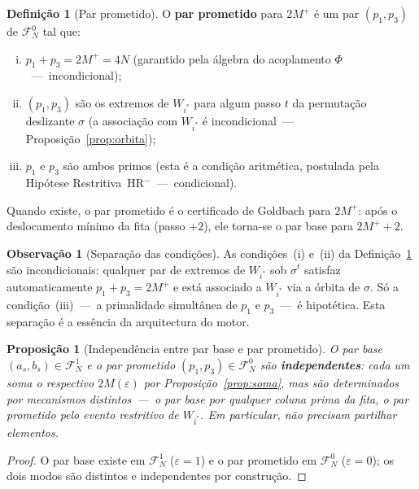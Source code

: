 \documentclass[12pt, a4paper]{article}
\theoremstyle{plain}
\newtheorem{proposition}[theorem]{Proposição}
\theoremstyle{definition}
\newtheorem{definition}[theorem]{Definição}
\newtheorem{remark}[theorem]{Observação}
\theoremstyle{remark}
\begin{document}
	\begin{definition}[Par prometido]
		\label{def:prometido}
		O \textbf{par prometido} para $2M^+$ é um par $(p_1,p_3)$ de
		$\mathcal{F}_N^0$ tal que:
		\begin{enumerate}[(i)]
			\item $p_1+p_3=2M^+=4N$
			(garantido pela álgebra do acoplamento $\Phi$~---~incondicional);
			\item $(p_1,p_3)$ são os extremos de $W_{i^*}$ para algum
			passo $t$ da permutação deslizante $\sigma$
			(a associação com $W_{i^*}$ é incondicional~---~
			Proposição~\ref{prop:orbita});
			\item $p_1$ e $p_3$ são ambos primos
			(esta é a condição aritmética, postulada pela Hipótese
			Restritiva~HR$^-$~---~condicional).
		\end{enumerate}
		Quando existe, o par prometido é o certificado de Goldbach para
		$2M^+$: após o deslocamento mínimo da fita (passo $+2$), ele
		torna-se o par base para $2M^++2$.
	\end{definition}
	
	\begin{remark}[Separação das condições]
		As condições~(i) e~(ii) da Definição~\ref{def:prometido} são
		incondicionais: qualquer par de extremos de $W_{i^*}$ sob
		$\sigma^t$ satisfaz automaticamente $p_1+p_3=2M^+$ e está
		associado a $W_{i^*}$ via a órbita de $\sigma$.  Só a
		condição~(iii)~---~a primalidade simultânea de $p_1$ e $p_3$~---~é
		hipotética.  Esta separação é a essência da arquitectura do motor.
	\end{remark}
	
	\begin{proposition}[Independência entre par base e par prometido]
		\label{prop:indep}
		O par base $(a_s,b_s)\in\mathcal{F}_N^1$ e o par prometido
		$(p_1,p_3)\in\mathcal{F}_N^0$ são \textbf{independentes}: cada
		um soma o respectivo $2M(\varepsilon)$ por
		Proposição~\ref{prop:soma}, mas são determinados por mecanismos
		distintos~---~o par base por qualquer coluna prima da fita, o par
		prometido pelo evento restritivo de $W_{i^*}$.  Em particular,
		não precisam partilhar elementos.
	\end{proposition}
	
	\begin{proof}
		O par base existe em $\mathcal{F}_N^1$ ($\varepsilon=1$) e o par
		prometido em $\mathcal{F}_N^0$ ($\varepsilon=0$); os dois modos
		são distintos e independentes por construção.
	\end{proof}
	
\end{document}
